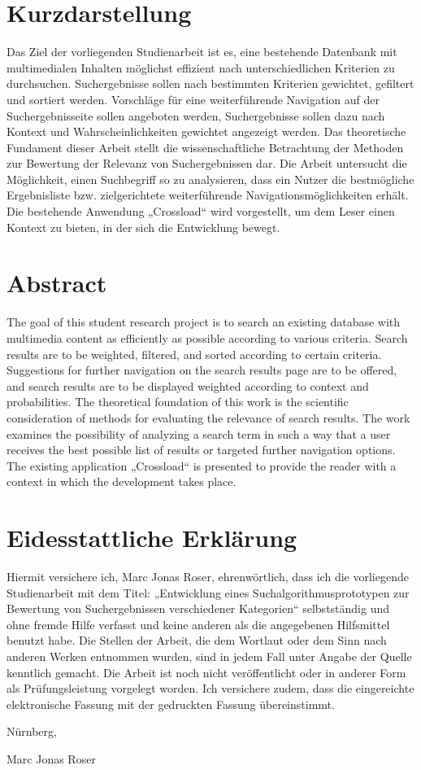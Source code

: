 \thispagestyle{empty}
\section*{Kurzdarstellung}
\label{sec:kurzdarstellung}
Das Ziel der vorliegenden Studienarbeit ist es, eine bestehende Datenbank mit multimedialen Inhalten möglichst effizient nach unterschiedlichen Kriterien zu durchsuchen.
Suchergebnisse sollen nach bestimmten Kriterien gewichtet, gefiltert und sortiert werden. Vorschläge für eine weiterführende Navigation auf der Suchergebnisseite sollen angeboten werden, Suchergebnisse sollen dazu nach Kontext und Wahrscheinlichkeiten gewichtet angezeigt werden.
Das theoretische Fundament dieser Arbeit stellt die wissenschaftliche Betrachtung der Methoden zur Bewertung der Relevanz von Suchergebnissen dar. Die Arbeit untersucht die Möglichkeit, einen Suchbegriff so zu analysieren, dass ein Nutzer die bestmögliche Ergebnisliste bzw. zielgerichtete weiterführende Navigationsmöglichkeiten erhält.
Die bestehende Anwendung „Crossload“ wird vorgestellt, um dem Leser einen Kontext zu bieten, in der sich die Entwicklung bewegt.

\section*{Abstract}
\label{sec:abstract}
The goal of this student research project is to search an existing database with multimedia content as efficiently as possible according to various criteria.
Search results are to be weighted, filtered, and sorted according to certain criteria. Suggestions for further navigation on the search results page are to be offered, and search results are to be displayed weighted according to context and probabilities.
The theoretical foundation of this work is the scientific consideration of methods for evaluating the relevance of search results. The work examines the possibility of analyzing a search term in such a way that a user receives the best possible list of results or targeted further navigation options.
The existing application „Crossload“ is presented to provide the reader with a context in which the development takes place.

\clearpage
\section*{Eidesstattliche Erklärung}
\label{sec:explanation}
Hiermit versichere ich, Marc Jonas Roser, ehrenwörtlich, dass ich die vorliegende Studienarbeit mit dem Titel: „Entwicklung eines Suchalgorithmusprototypen zur Bewertung von Suchergebnissen verschiedener Kategorien“ selbstständig und ohne fremde Hilfe verfasst und keine anderen als die angegebenen Hilfsmittel benutzt habe. Die Stellen der Arbeit, die dem Wortlaut oder dem Sinn nach anderen Werken entnommen wurden, sind in jedem Fall unter Angabe der Quelle kenntlich gemacht. Die Arbeit ist noch nicht veröffentlicht oder in anderer Form als Prüfungsleistung vorgelegt worden.
Ich versichere zudem, dass die eingereichte elektronische Fassung mit der gedruckten Fassung übereinstimmt.

Nürnberg, \publishDate

Marc Jonas Roser
